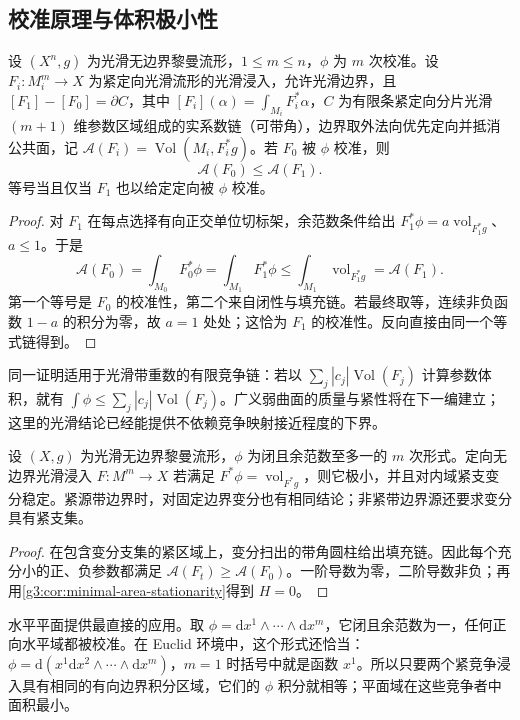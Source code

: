 \subsection{校准原理与体积极小性}
\label{g3:subsec:1904:03}
\begin{theorem}[校准原理]\label{g3:thm:calibrated-volume-minimizing}
	设 \((X^n,g)\) 为光滑无边界黎曼流形，\(1\le m\le n\)，\(\phi\) 为 \(m\) 次校准。设 \(F_i:M_i^m\to X\) 为紧定向光滑流形的光滑浸入，允许光滑边界，且 \([F_1]-[F_0]=\partial C\)，其中 \([F_i](\alpha)=\int_{M_i}F_i^*\alpha\)，\(C\) 为有限条紧定向分片光滑 \((m+1)\) 维参数区域组成的实系数链（可带角），边界取外法向优先定向并抵消公共面，记 \(\mathcal A(F_i)=\operatorname{Vol}(M_i,F_i^*g)\)。若 \(F_0\) 被 \(\phi\) 校准，则
	\[
		\mathcal A(F_0)\le\mathcal A(F_1).
	\]
	等号当且仅当 \(F_1\) 也以给定定向被 \(\phi\) 校准。
\end{theorem}
\begin{proof}
	对 \(F_1\) 在每点选择有向正交单位切标架，余范数条件给出
	\(F_1^*\phi=a\operatorname{vol}_{F_1^*g}\)、\(a\le1\)。于是
	\[
		\mathcal A(F_0)=\int_{M_0}F_0^*\phi
		=\int_{M_1}F_1^*\phi
		\le\int_{M_1}\operatorname{vol}_{F_1^*g}
		=\mathcal A(F_1).
	\]
	第一个等号是 \(F_0\) 的校准性，第二个来自闭性与填充链。若最终取等，连续非负函数 \(1-a\) 的积分为零，故 \(a=1\) 处处；这恰为 \(F_1\) 的校准性。反向直接由同一个等式链得到。
\end{proof}

同一证明适用于光滑带重数的有限竞争链：若以 \(\sum_j|c_j|\operatorname{Vol}(F_j)\) 计算参数体积，就有 \(\int\phi\le\sum_j|c_j|\operatorname{Vol}(F_j)\)。广义弱曲面的质量与紧性将在下一编建立；这里的光滑结论已经能提供不依赖竞争映射接近程度的下界。

\begin{corollary}\label{g3:cor:calibrated-minimal-stable}
	设 \((X,g)\) 为光滑无边界黎曼流形，\(\phi\) 为闭且余范数至多一的 \(m\) 次形式。定向无边界光滑浸入 \(F:M^m\to X\) 若满足 \(F^*\phi=\operatorname{vol}_{F^*g}\)，则它极小，并且对内域紧支变分稳定。紧源带边界时，对固定边界变分也有相同结论；非紧带边界源还要求变分具有紧支集。
\end{corollary}
\begin{proof}
	在包含变分支集的紧区域上，变分扫出的带角圆柱给出填充链。因此每个充分小的正、负参数都满足 \(\mathcal A(F_t)\ge\mathcal A(F_0)\)。一阶导数为零，二阶导数非负；再用\cref{g3:cor:minimal-area-stationarity}得到 \(H=0\)。
\end{proof}

水平平面提供最直接的应用。取 \(\phi=\mathrm dx^1\wedge\cdots\wedge\mathrm dx^m\)，它闭且余范数为一，任何正向水平域都被校准。在 Euclid 环境中，这个形式还恰当：
\(\phi=\mathrm d(x^1\mathrm dx^2\wedge\cdots\wedge\mathrm dx^m)\)，\(m=1\) 时括号中就是函数 \(x^1\)。所以只要两个紧竞争浸入具有相同的有向边界积分区域，它们的 \(\phi\) 积分就相等；平面域在这些竞争者中面积最小。

